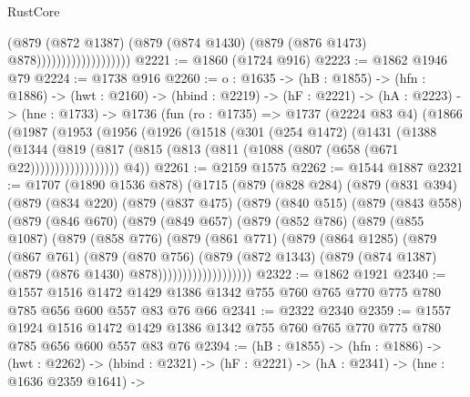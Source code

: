 \begin{lexlean}{RustCore}
\begin{coremodule}
                                    (@879
                                      (@872 @1387)
                                      (@879 (@874 @1430) (@879 (@876 @1473) @878)))))))))))))))))))
@2221 := @1860 (@1724 @916)
@2223 := @1862 @1946 @79
@2224 := @1738 @916
@2260 := {o : @1635} ->
  (hB : @1855) ->
  (hfn : @1886) ->
  (hwt : @2160) ->
  (hbind : @2219) ->
  (hF : @2221) ->
  (hA : @2223) ->
  (hne : @1733) ->
  @1736
    (fun (ro : @1735) =>
    @1737
      (@2224 @83 @4)
      (@1866
        (@1987
          (@1953
            (@1956
              (@1926
                (@1518
                  (@301
                    (@254 @1472)
                    (@1431
                      (@1388
                        (@1344
                          (@819
                            (@817 (@815 (@813 (@811 (@1088 (@807 (@658 (@671 @22))))))))))))))))))
        @4))
@2261 := @2159 @1575
@2262 := @1544 @1887
@2321 := @1707
    (@1890 @1536 @878)
    (@1715
      (@879
        (@828 @284)
        (@879
          (@831 @394)
          (@879
            (@834 @220)
            (@879
              (@837 @475)
              (@879
                (@840 @515)
                (@879
                  (@843 @558)
                  (@879
                    (@846 @670)
                    (@879
                      (@849 @657)
                      (@879
                        (@852 @786)
                        (@879
                          (@855 @1087)
                          (@879
                            (@858 @776)
                            (@879
                              (@861 @771)
                              (@879
                                (@864 @1285)
                                (@879
                                  (@867 @761)
                                  (@879
                                    (@870 @756)
                                    (@879
                                      (@872 @1343)
                                      (@879 (@874 @1387) (@879 (@876 @1430) @878)))))))))))))))))))
@2322 := @1862 @1921
@2340 := @1557
    @1516
    @1472
    @1429
    @1386
    @1342
    @755
    @760
    @765
    @770
    @775
    @780
    @785
    @656
    @600
    @557
    @83
    @76
    @66
@2341 := @2322 @2340
@2359 := @1557
    @1924
    @1516
    @1472
    @1429
    @1386
    @1342
    @755
    @760
    @765
    @770
    @775
    @780
    @785
    @656
    @600
    @557
    @83
    @76
@2394 := (hB : @1855) ->
  (hfn : @1886) ->
  (hwt : @2262) ->
  (hbind : @2321) ->
  (hF : @2221) ->
  (hA : @2341) ->
  (hne : @1636 @2359 @1641) ->

\end{coremodule}
\end{lexlean}
